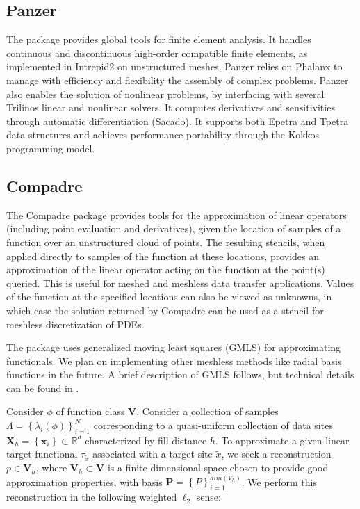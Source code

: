 \subsection{Panzer}
The package provides global tools for finite element analysis. It handles continuous and discontinuous high-order compatible finite elements, as implemented in Intrepid2 on unstructured meshes. Panzer relies on Phalanx to manage with efficiency and flexibility the assembly of complex problems. Panzer also enables the solution of nonlinear problems, by interfacing with several Trilinos linear and nonlinear solvers. It computes derivatives and sensitivities through automatic differentiation (Sacado). It supports both Epetra and Tpetra data structures and achieves performance portability through the Kokkos programming model.

\subsection{Compadre}
The Compadre package provides tools for the approximation of linear operators (including point evaluation and derivatives), given the location of samples of a function over an unstructured cloud of points. The resulting stencils, when applied directly to samples of the function at these locations, provides an approximation of the linear operator acting on the function at the point(s) queried. This is useful for meshed and meshless data transfer applications. Values of the function at the specified locations can also be viewed as unknowns, in which case the solution returned by Compadre can be used as a stencil for meshless discretization of PDEs. 

The package uses generalized moving least squares (GMLS) for approximating functionals. We plan on implementing other meshless methods like radial basis functions in the future.  A brief description of GMLS follows, but technical details can be found in \cite{mirzaei2012generalized,wendland2004scattered}.

Consider $\phi$ of function class $\mathbf{V}$. Consider a collection of samples $\Lambda = \left\{\lambda_i(\phi)\right\}_{i=1}^{N}$ corresponding to a quasi-uniform\cite{wendland2004scattered} collection of data sites $\mathbf{X}_h = \left\{\mathbf{x}_i\right\} \subset \mathbb{R}^d$ characterized by fill distance $h$. To approximate a given linear target functional $\tau_{\tilde{x}}$ associated with a target site $\tilde{x}$, we seek a reconstruction $p \in \mathbf{V}_h$, where $\mathbf{V}_h \subset \mathbf{V}$ is a finite dimensional space chosen to provide good approximation properties, with basis $\mathbf{P}=\left\{P\right\}_{i=1}^{dim(V_h)}$. We perform this reconstruction in the following weighted $\ell_2$ sense:

